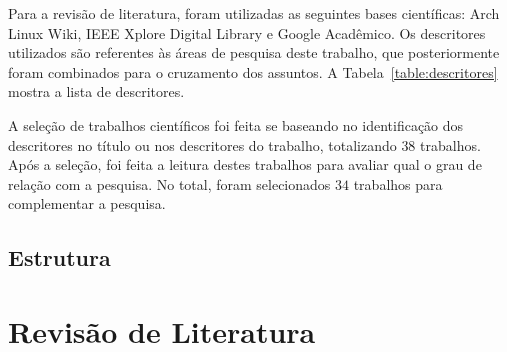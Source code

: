 \documentclass[
article,			%
12pt,				%
openright,			%
oneside,			%
a4paper,			%
chapter=TITLE,		%
section=TITLE,		%
subsection=TITLE,	%
subsubsection=TITLE,%
subsubsubsection=TITLE, %
english,			%
brazil,				%
]{abntex2}
\begin{document}
Para a revisão de literatura, foram utilizadas as seguintes bases
científicas: Arch Linux Wiki, IEEE Xplore Digital Library e Google
Acadêmico. Os descritores utilizados são referentes às áreas de
pesquisa deste trabalho, que posteriormente foram combinados para o
cruzamento dos assuntos. A Tabela~\ref{table:descritores} mostra a
lista de descritores.

\begin{table}[H]
    \centering
    \caption{\label{table:descritores}Descritores utilizados}
\end{table}

A seleção de trabalhos científicos foi feita se baseando no
identificação dos descritores no título ou nos descritores do
trabalho, totalizando $38$ trabalhos.  Após a seleção, foi feita a
leitura destes trabalhos para avaliar qual o grau de relação com a
pesquisa. No total, foram selecionados $34$ trabalhos para
complementar a pesquisa.

\subsection{Estrutura}

\section{Revisão de Literatura}

\end{document}
